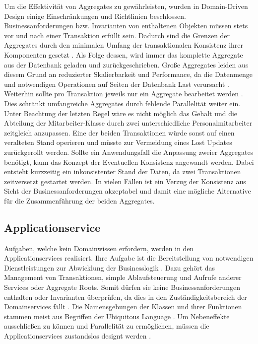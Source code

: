 Um die Effektivität von Aggregates zu gewährleisten, wurden in Domain-Driven Design einige Einschränkungen und Richtlinien beschlossen. Businessanforderungen bzw. Invarianten von enthaltenen Objekten müssen stets vor und nach einer Transaktion erfüllt sein. Dadurch sind die Grenzen der Aggregates durch den minimalen Umfang der transaktionalen Konsistenz ihrer Komponenten gesetzt \cite[S. 354]{Vernon.2015}. Als Folge dessen, wird immer das komplette Aggregate aus der Datenbank geladen und zurückgeschrieben. Große Aggregates leiden aus diesem Grund an reduzierter Skalierbarkeit und Performance, da die Datenmenge und notwendigen Operationen auf Seiten der Datenbank Last verursacht \cite[S. 355]{Vernon.2015}. Weiterhin sollte pro Transaktion jeweils nur ein Aggregate bearbeitet werden \cite[S. 354]{Vernon.2015}. Dies schränkt umfangreiche Aggregates durch fehlende Parallelität weiter ein. Unter Beachtung der letzten Regel wäre es nicht möglich das Gehalt und die Abteilung der Mitarbeiter-Klasse durch zwei unterschiedliche Personalmitarbeiter zeitgleich anzupassen. Eine der beiden Transaktionen würde sonst auf einen veralteten Stand operieren und müsste zur Vermeidung eines \Gls{Lost Update}s zurückgerollt werden. Sollte ein Anwendungsfall die Anpassung zweier Aggregates benötigt, kann das Konzept der Eventuellen Konsistenz angewandt werden. Dabei entsteht kurzzeitig ein inkonsistenter Stand der Daten, da zwei Transaktionen zeitversetzt gestartet werden. In vielen Fällen ist ein Verzug der Konsistenz aus Sicht der Businessanforderungen akzeptabel und damit eine mögliche Alternative für die Zusammenführung der beiden Aggregates. \cite[S. 364]{Vernon.2015}

\pagebreak

\subsection{Applicationservice}

Aufgaben, welche kein Domainwissen erfordern, werden in den Applicationservices realisiert. Ihre Aufgabe ist die Bereitstellung von notwendigen Dienstleistungen zur Abwicklung der Businesslogik \cite{Gorodinski.2012}. Dazu gehört das Management von Transaktionen, simple Ablaufsteuerung und Aufrufe anderer Services oder Aggregate Roots. Somit dürfen sie keine Businessanforderungen enthalten oder Invarianten überprüfen, da dies in den Zuständigkeitsbereich der Domainservices fällt \cite[S. 267]{Vernon.2015}. Die Namensgebungen der Klassen und ihrer Funktionen stammen meist aus Begriffen der Ubiquitous Language \cite[S. 105]{Evans.2011}. Um Nebeneffekte ausschließen zu können und Parallelität zu ermöglichen, müssen die Applicationservices zustandslos designt werden \cite[S. 105]{Evans.2011}.


